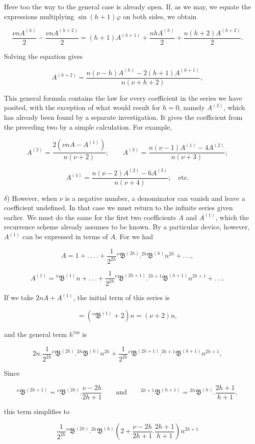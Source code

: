\noindent Here too the way to the general case is already open. If, as we may, we equate the expressions multiplying $\sin(h+1)\varphi$ on both sides, we obtain

\[
\frac{\nu nA^{(h)}}{2}-\frac{\nu nA^{(h+2)}}{2}=(h+1)A^{(h+1)}+\frac{nhA^{(h)}}{2}+\frac{n(h+2)A^{(h+2)}}{2}.
\]

\noindent Solving the equation gives

\[
A^{(h+2)}=\frac{n(\nu-h)A^{(h)}-2(h+1)A^{(h+1)}}{n(\nu+h+2)},
\]

\noindent This general formula contains the law for every coefficient in the series we have posited, with the exception of what would result for $h=0$, namely $A^{(2)}$, which has already been found by a separate investigation. It gives the coefficient from the preceding two by a simple calculation. For example,

\[
A^{(2)}=\frac{2(\nu nA-A^{(1)})}{n(\nu+2)};\qquad A^{(3)}=\frac{n(\nu-1)A^{(1)}-4A^{(2)}}{n(\nu+3)};
\]

\[
A^{(4)}=\frac{n(\nu-2)A^{(2)}-6A^{(3)}}{n(\nu+4)};\quad\mbox{etc.}
\]

$\delta$) However, when $\nu$ is a negative number, a denominator can vanish and leave a coefficient undefined. In that case we must return to the infinite series given earlier. We must do the same for the first two coefficients $A$ and $A^{(1)}$, which the recurrence scheme already assumes to be known. By a particular device, however, $A^{(1)}$ can be expressed in terms of $A$. For we had

\[
A=1+.\,.\,.\,.+\frac{1}{2^{2h}}{}^{\nu}\mathfrak{B}^{(2h)}.{}^{2h}\mathfrak{B}^{(h)}n^{2h}+.\,.\,.,
\]

\[
A^{(1)}={}^{\nu}\mathfrak{B}^{(1)}n+.\,.\,.+\frac{1}{2^{2h}}{}^{\nu}\mathfrak{B}^{(2h+1)}.{}^{2h+1}\mathfrak{B}^{(h+1)}n^{2h+1}+.\,.\,..
\]

\noindent If we take $2nA+A^{(1)}$, the initial term of this series is

\[
=({}^{\nu}\mathfrak{B}^{(1)}+2)n=(\nu+2)n,
\]

\noindent and the general term $h^{\text{tus}}$ is

\[
2n . \frac{1}{2^{2h}}{}^{\nu}\mathfrak{B}^{(2h)}.{}^{2h}\mathfrak{B}^{(h)}n^{2h}+\frac{1}{2^{2h}}{}^{\nu}\mathfrak{B}^{(2h+1)}.{}^{2h+1}\mathfrak{B}^{(h+1)}n^{2h+1},
\]

\noindent Since

\[
{}^{\nu}\mathfrak{B}^{(2h+1)}={}^{\nu}\mathfrak{B}^{(2h)} . \frac{\nu-2h}{2h+1}\qquad\mbox{and}\qquad {}^{2h+1}\mathfrak{B}^{(h+1)}={}^{2h}\mathfrak{B}^{(h)} . \frac{2h+1}{h+1},
\]

\noindent this term simplifies to

\[
\frac{1}{2^{2h}}{}^{\nu}\mathfrak{B}^{(2h)}.{}^{2h}\mathfrak{B}^{(h)}\left(2+\frac{\nu-2h}{2h+1} . \frac{2h+1}{h+1}\right)n^{2h+1}
\]


